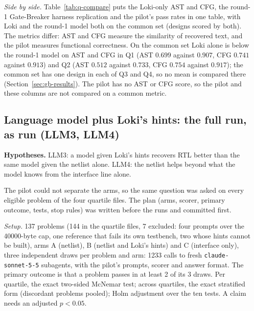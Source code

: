 \documentclass[conference]{IEEEtran}
\newcommand{\hev}[1]{\par\smallskip\noindent\textbf{#1}}
\newcommand{\code}[1]{\texttt{#1}}
\begin{document}
\emph{Side by side.} Table~\ref{tab:q-compare} puts the Loki-only AST and CFG, the round-1
Gate-Breaker harness replication and the pilot's pass rates in one table, with Loki and the
round-1 model both on the common set (designs scored by both). The metrics differ: AST and CFG
measure the similarity of recovered text, and the pilot measures functional correctness. On the
common set Loki alone is below the round-1 model on AST and CFG in Q1 (AST $0.699$ against
$0.907$, CFG $0.741$ against $0.913$) and Q2 (AST $0.512$ against $0.733$, CFG $0.754$ against
$0.917$); the common set has one design in each of Q3 and Q4, so no mean is compared there
(Section~\ref{sec:gb-results}). The pilot has no AST or CFG score, so the pilot and these
columns are not compared on a common metric.

\subsection{Language model plus Loki's hints: the full run, as run (LLM3, LLM4)}
\label{sec:llm-full-rec}

\hev{Hypotheses.} LLM3: a model given Loki's hints recovers RTL better than the same model given the netlist
alone. LLM4: the netlist helps beyond what the model knows from the interface line alone.


The pilot could not separate the arms, so the same question was asked on every eligible problem of the four
quartile files. The plan (arms, scorer, primary outcome, tests, stop rules) was written before the runs and committed first.

\emph{Setup.} 137 problems (144 in the quartile files, 7 excluded: four prompts over the 40000-byte cap, one
reference that fails its own testbench, two whose hints cannot be built), arms A (netlist), B (netlist and Loki's hints)
and C (interface only), three independent draws per problem and arm: 1233 calls to fresh \code{claude-sonnet-5-5}
subagents, with the pilot's prompts, scorer and answer format. The primary outcome is that a problem passes in at least 2 of
its 3 draws. Per quartile, the exact two-sided McNemar test; across quartiles, the exact stratified form (discordant problems pooled); Holm
adjustment over the ten tests. A claim needs an adjusted $p<0.05$.
\end{document}
